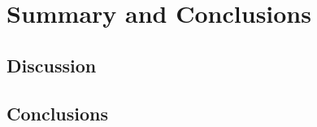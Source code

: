
\chapter{Summary and Conclusions} %

\section{Discussion}
\section{Conclusions}
\pagebreak
\pagebreak


